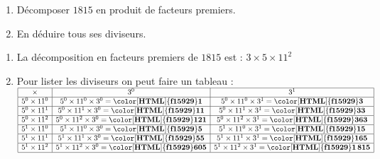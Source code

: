 \begin{exercice*}
    \begin{enumerate}
        \item Décomposer $\num{1815}$ en produit de facteurs premiers.
        \item En déduire tous ses diviseurs.
    \end{enumerate}

\end{exercice*}
\begin{corrige}

    \begin{enumerate}
        \item La décomposition en facteurs premiers de $\num{1815}$ est : $3\times 5\times 11^{2}$ 
        \item Pour lister les diviseurs on peut faire un tableau :
        $\renewcommand{\arraystretch}{1}
        \begin{array}{|c|c|c|}
        \hline
        \times & 3^{0} & 3^{1}\\
        \hline
        5^{0}\times11^{0} & 5^{0}\times11^{0}\times3^{0}=\mathbf{{\color[HTML]{f15929}1}} & 5^{0}\times11^{0}\times3^{1}=\mathbf{{\color[HTML]{f15929}3}}\\
        \hline
        5^{0}\times11^{1} & 5^{0}\times11^{1}\times3^{0}=\mathbf{{\color[HTML]{f15929}11}} & 5^{0}\times11^{1}\times3^{1}=\mathbf{{\color[HTML]{f15929}33}}\\
        \hline
        5^{0}\times11^{2} & 5^{0}\times11^{2}\times3^{0}=\mathbf{{\color[HTML]{f15929}121}} & 5^{0}\times11^{2}\times3^{1}=\mathbf{{\color[HTML]{f15929}363}}\\
        \hline
        5^{1}\times11^{0} & 5^{1}\times11^{0}\times3^{0}=\mathbf{{\color[HTML]{f15929}5}} & 5^{1}\times11^{0}\times3^{1}=\mathbf{{\color[HTML]{f15929}15}}\\
        \hline
        5^{1}\times11^{1} & 5^{1}\times11^{1}\times3^{0}=\mathbf{{\color[HTML]{f15929}55}} & 5^{1}\times11^{1}\times3^{1}=\mathbf{{\color[HTML]{f15929}165}}\\
        \hline
        5^{1}\times11^{2} & 5^{1}\times11^{2}\times3^{0}=\mathbf{{\color[HTML]{f15929}605}} & 5^{1}\times11^{2}\times3^{1}=\mathbf{{\color[HTML]{f15929}1\,815}}\\
        \hline
        \end{array}
        \renewcommand{\arraystretch}{1}$


\end{enumerate}
\end{corrige}
